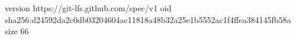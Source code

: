 version https://git-lfs.github.com/spec/v1
oid sha256:d24592da2c0db03204604ac11818a48b32a25e1b5552ac1f4ffea384145fb58a
size 66
